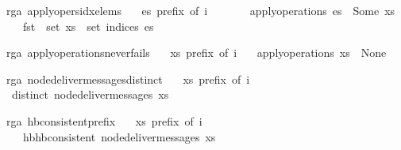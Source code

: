 \documentclass[acmlarge,review,anonymous]{acmart}\settopmatter{printfolios=true}
\begin{document}
\begin{isabellebody}
\isanewline
{}\isamarkupfalse%
\ {\isacharparenleft}\ rga{\isacharparenright}\ apply{\isacharunderscore}opers{\isacharunderscore}idx{\isacharunderscore}elems{\isacharcolon}\isanewline
\ \ \ {\isachardoublequoteopen}es\ prefix\ of\ i{\isachardoublequoteclose}\isanewline
\ \ \ \ \ \ \ {\isachardoublequoteopen}apply{\isacharunderscore}operations\ es\ {\isacharequal}\ Some\ xs{\isachardoublequoteclose}\isanewline
\ \ \ \ \ {\isachardoublequoteopen}fst\ {\isacharbackquote}\ set\ xs\ {\isacharequal}\ set\ {\isacharparenleft}indices\ es{\isacharparenright}{\isachardoublequoteclose}\isanewline
\end{isabellebody}


\begin{isabellebody}
\isanewline
{}\isamarkupfalse%
\ {\isacharparenleft}\ rga{\isacharparenright}\ apply{\isacharunderscore}operations{\isacharunderscore}never{\isacharunderscore}fails{\isacharcolon}\isanewline
\ \ \ {\isachardoublequoteopen}xs\ prefix\ of\ i{\isachardoublequoteclose}\isanewline
\ \ \ {\isachardoublequoteopen}apply{\isacharunderscore}operations\ xs\ {\isasymnoteq}\ None{\isachardoublequoteclose}\isanewline
\end{isabellebody}

\begin{isabellebody}
\isanewline
{}\isamarkupfalse%
\ {\isacharparenleft}\ rga{\isacharparenright}\ node{\isacharunderscore}deliver{\isacharunderscore}messages{\isacharunderscore}distinct{\isacharcolon}\isanewline
\ \ \ {\isachardoublequoteopen}xs\ prefix\ of\ i{\isachardoublequoteclose}\isanewline
\ \ \ {\isachardoublequoteopen}distinct\ {\isacharparenleft}node{\isacharunderscore}deliver{\isacharunderscore}messages\ xs{\isacharparenright}{\isachardoublequoteclose}\isanewline
\end{isabellebody}

\begin{isabellebody}
\isanewline
{}\isamarkupfalse%
\ {\isacharparenleft}\ rga{\isacharparenright}\ hb{\isacharunderscore}consistent{\isacharunderscore}prefix{\isacharcolon}\isanewline
\ \ \ {\isachardoublequoteopen}xs\ prefix\ of\ i{\isachardoublequoteclose}\isanewline
\ \ \ \ \ {\isachardoublequoteopen}hb{\isachardot}hb{\isacharunderscore}consistent\ {\isacharparenleft}node{\isacharunderscore}deliver{\isacharunderscore}messages\ xs{\isacharparenright}{\isachardoublequoteclose}\isanewline
\end{isabellebody}
\end{document}
